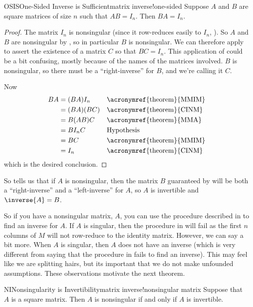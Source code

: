 %
%
\begin{theorem}{OSIS}{One-Sided Inverse is Sufficient}{matrix inverse!one-sided}
Suppose $A$ and $B$ are  square matrices of size $n$ such that $AB=I_n$.  Then $BA=I_n$.
\end{theorem}
%
\begin{proof}
The matrix $I_n$ is nonsingular (since it row-reduces easily to $I_n$, ).  So $A$ and $B$ are nonsingular by , so in particular $B$ is nonsingular.  We can therefore apply  to assert the existence of a matrix $C$ so that $BC=I_n$.  This application of  could be a bit confusing, mostly because of the names of the matrices involved.  $B$ is nonsingular, so there must be a ``right-inverse'' for $B$, and we're calling it $C$.\par
%
Now
%
\begin{align*}
BA
&=(BA)I_n&&\text{\acronymref{theorem}{MMIM}}\\
&=(BA)(BC)&&\text{\acronymref{theorem}{CINM}}\\
&=B(AB)C&&\text{\acronymref{theorem}{MMA}}\\
&=BI_nC&&\text{Hypothesis}\\
&=BC&&\text{\acronymref{theorem}{MMIM}}\\
&=I_n&&\text{\acronymref{theorem}{CINM}}
\end{align*}
%
which is the desired conclusion.
%
\end{proof}
%
So  tells us that if $A$ is nonsingular, then the matrix $B$ guaranteed by  will be both a ``right-inverse'' and a ``left-inverse'' for $A$, so $A$ is invertible and $\inverse{A}=B$.\par
%
So if you have a nonsingular matrix, $A$, you can use the procedure described in  to find an inverse for $A$.  If $A$ is singular, then the procedure in  will fail as the first $n$ columns of $M$ will not row-reduce to the identity matrix.  However, we can say a bit more.  When $A$ is singular, then $A$ does not have an inverse (which is very different from saying that the procedure in  fails to find an inverse).
This may feel like we are splitting hairs, but its important that we do not make unfounded assumptions.  These observations motivate the next theorem.
%
\begin{theorem}{NI}{Nonsingularity is Invertibility}{matrix inverse!nonsingular matrix}
Suppose that $A$ is a square matrix.  Then $A$ is nonsingular if and only if $A$ is invertible.
\end{theorem}
